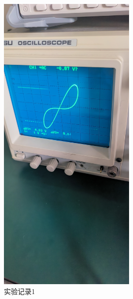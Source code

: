 \documentclass{ctexart}
\begin{document}
\begin{figure}[H]
  \centering
  \includegraphics[width=0.6\textwidth,height=0.2\textheight]{shiyanjilu1.jpg}
  \caption{实验记录1}
\end{figure}
\end{document}
